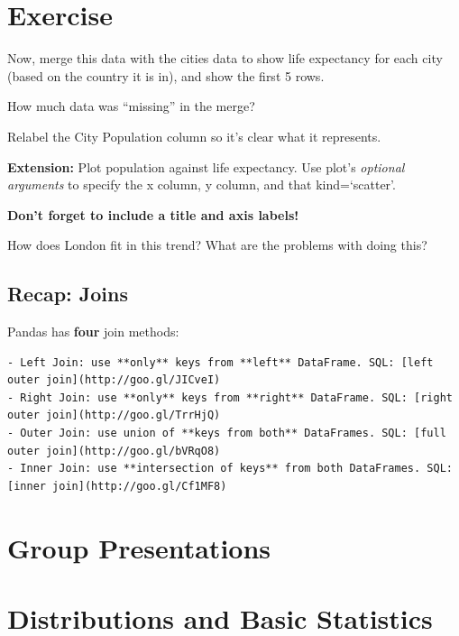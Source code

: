 \documentclass[
  letterpaper,
  DIV=11,
  numbers=noendperiod]{scrreprt}
\begin{document}

\hypertarget{exercise-16}{%
\chapter{Exercise}\label{exercise-16}}

Now, merge this data with the cities data to show life expectancy for
each city (based on the country it is in), and show the first 5 rows.

How much data was ``missing'' in the merge?

Relabel the City Population column so it's clear what it represents.

\textbf{Extension:} Plot population against life expectancy. Use plot's
\emph{optional arguments} to specify the x column, y column, and that
kind=`scatter'.

\textbf{Don't forget to include a title and axis labels!}

How does London fit in this trend? What are the problems with doing
this?

\hypertarget{recap-joins}{%
\section{Recap: Joins}\label{recap-joins}}

Pandas has \textbf{four} join methods:

\begin{verbatim}
- Left Join: use **only** keys from **left** DataFrame. SQL: [left outer join](http://goo.gl/JICveI)
- Right Join: use **only** keys from **right** DataFrame. SQL: [right outer join](http://goo.gl/TrrHjQ)
- Outer Join: use union of **keys from both** DataFrames. SQL: [full outer join](http://goo.gl/bVRqO8)
- Inner Join: use **intersection of keys** from both DataFrames. SQL: [inner join](http://goo.gl/Cf1MF8)
\end{verbatim}


\hypertarget{group-presentations}{%
\chapter{Group Presentations}\label{group-presentations}}


\hypertarget{distributions-and-basic-statistics}{%
\chapter{Distributions and Basic
Statistics}\label{distributions-and-basic-statistics}}
\end{document}
